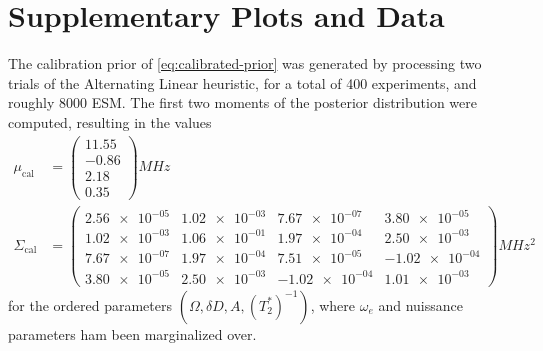 \documentclass[aps,nofootinbib,twocolumn,superscriptaddress]{revtex4}
\newcommand{\calib}{{\text{cal}}}
\begin{document}






\appendix
\onecolumngrid

\section{Supplementary Plots and Data}
\label{apx:supp-plots-and-data}

The calibration prior of \autoref{eq:calibrated-prior} was generated
by processing two trials of the Alternating Linear heuristic, for
a total of 400 experiments, and roughly 8000 ESM.
The first two moments of the posterior distribution were computed, resulting in
the values
\begin{subequations}
\begin{align}
    \mu_\calib&=\begin{pmatrix}
        11.55 \\ -0.86 \\ 2.18 \\ 0.35
    \end{pmatrix}
    \si{MHz} \\
    \Sigma_\calib&=\begin{pmatrix}
        \num{2.56e-05} & \num{1.02e-03} & \num{7.67e-07} & \num{3.80e-05} \\
        \num{1.02e-03} & \num{1.06e-01} & \num{1.97e-04} & \num{2.50e-03} \\
        \num{7.67e-07} & \num{1.97e-04} & \num{7.51e-05} & \num{-1.02e-04} \\
        \num{3.80e-05} & \num{2.50e-03} & \num{-1.02e-04} & \num{1.01e-03}
    \end{pmatrix}
    \si{MHz^2}
\end{align}
\end{subequations}
for the ordered parameters $(\Omega,\delta D,A,(T_2^*)^{-1})$,
where $\omega_e$ and nuissance parameters ham been marginalized over.
\end{document}
